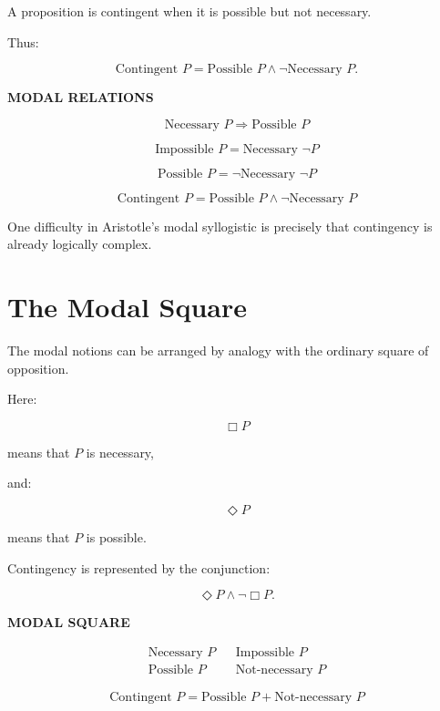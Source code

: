 \documentclass[11pt]{article}
\begin{document}
A proposition is contingent when it is possible but not
necessary.

Thus:

\[
\text{Contingent }P
=
\text{Possible }P
\land
\neg\text{Necessary }P.
\]

\begin{whiteboard}
\textbf{MODAL RELATIONS}

\[
\text{Necessary }P
\Rightarrow
\text{Possible }P
\]

\[
\text{Impossible }P
=
\text{Necessary }\neg P
\]

\[
\text{Possible }P
=
\neg\text{Necessary }\neg P
\]

\[
\boxed{
\text{Contingent }P
=
\text{Possible }P
\land
\neg\text{Necessary }P
}
\]
\end{whiteboard}

One difficulty in Aristotle's modal syllogistic is precisely that
contingency is already logically complex.

\section{The Modal Square}

The modal notions can be arranged by analogy with the ordinary
square of opposition.

\begin{center}
\end{center}

Here:

\[
\Box P
\]

means that \(P\) is necessary,

and:

\[
\Diamond P
\]

means that \(P\) is possible.

Contingency is represented by the conjunction:

\[
\Diamond P\land\neg\Box P.
\]

\begin{whiteboard}
\textbf{MODAL SQUARE}

\[
\begin{array}{ccc}
\text{Necessary }P
&&
\text{Impossible }P
\\[1em]
\text{Possible }P
&&
\text{Not-necessary }P
\end{array}
\]

\[
\boxed{
\text{Contingent }P
=
\text{Possible }P
+
\text{Not-necessary }P
}
\]
\end{whiteboard}
\end{document}

